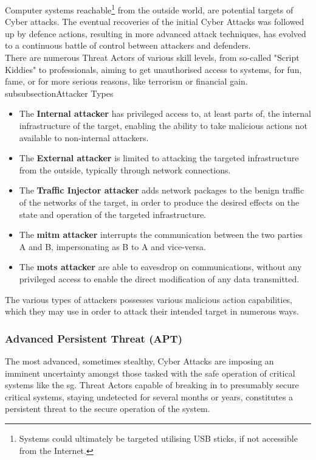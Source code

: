 Computer systems reachable\footnote{Systems could ultimately be targeted utilising USB sticks, if not accessible from the Internet.} from the outside world,  are potential targets of Cyber attacks. The eventual recoveries of the initial Cyber Attacks was followed up by defence actions, resulting in more advanced attack techniques, has evolved to a continuous battle of control between attackers and defenders. \\


There are numerous Threat Actors of various skill levels, from so-called "Script Kiddies" to professionals, aiming to get unauthorised access to systems, for fun, fame, or for more serious reasons, like terrorism or financial gain. 
subsubsection{Attacker Types}

\begin{itemize}
    \item The \textbf{Internal attacker} has privileged access to, at least parts of, the internal infrastructure of the target, enabling the ability to take malicious actions not available to non-internal attackers.
    \item The \textbf{External attacker} is limited to attacking the targeted infrastructure from the outside, typically through network connections.
    \item The \textbf{Traffic Injector attacker} adds network packages to the benign traffic of the networks of the target, in order to produce the desired effects on the state and operation of the targeted infrastructure. 
    \item The \textbf{\acrshort{mitm} attacker} interrupts the communication between the two parties A and B, impersonating as B to A and vice-versa.
    \item The  \textbf{\acrshort{mots} attacker} are able to eavesdrop on communications, without any privileged access to enable the direct modification of any data transmitted.
\end{itemize}



The various types of attackers possesses various malicious action capabilities, which they may use in order to attack their intended target in numerous ways.


\subsubsection{Advanced Persistent Threat (APT)}

The most advanced, sometimes stealthy, Cyber Attacks are imposing an imminent uncertainty amongst those tasked with the safe operation of critical systems like the \acrshort{sg}. Threat Actors capable of breaking in to presumably secure critical systems, staying undetected for several months or years, constitutes a persistent threat to the secure operation of the system.

